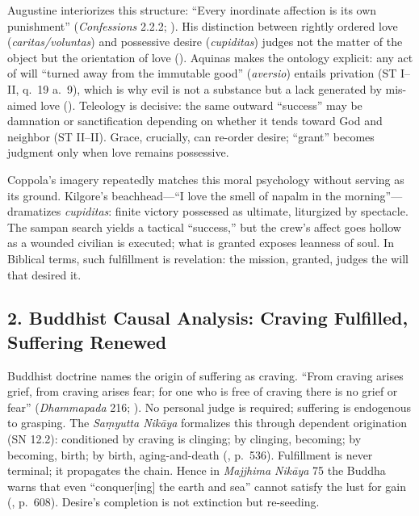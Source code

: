 Augustine interiorizes this structure: ``Every inordinate affection is its own punishment'' (\emph{Confessions} 2.2.2; ). His distinction between rightly ordered love (\emph{caritas/voluntas}) and possessive desire (\emph{cupiditas}) judges not the matter of the object but the orientation of love (\parencite{AugustineCity2003}). Aquinas makes the ontology explicit: any act of will ``turned away from the immutable good'' (\emph{aversio}) entails privation (ST I--II, q.~19 a.~9), which is why evil is not a substance but a lack generated by mis-aimed love (). Teleology is decisive: the same outward ``success'' may be damnation or sanctification depending on whether it tends toward God and neighbor (ST II--II). Grace, crucially, can re-order desire; ``grant'' becomes judgment only when love remains possessive.

Coppola’s imagery repeatedly matches this moral psychology without serving as its ground. Kilgore’s beachhead---``I love the smell of napalm in the morning''---dramatizes \emph{cupiditas}: finite victory possessed as ultimate, liturgized by spectacle. The sampan search yields a tactical ``success,'' but the crew’s affect goes hollow as a wounded civilian is executed; what is granted exposes leanness of soul. In Biblical terms, such fulfillment is revelation: the mission, granted, judges the will that desired it.

\subsection*{2. Buddhist Causal Analysis: Craving Fulfilled, Suffering Renewed}
\label{ssec:2-buddhist-causal-analysis-craving-fulfilled-suffering-renewed}

Buddhist doctrine names the origin of suffering as craving. ``From craving arises grief, from craving arises fear; for one who is free of craving there is no grief or fear'' (\emph{Dhammapada} 216; \parencite{BuddharakkhitaDhp1993}). No personal judge is required; suffering is endogenous to grasping. The \emph{Saṃyutta Nikāya} formalizes this through dependent origination (SN 12.2): conditioned by craving is clinging; by clinging, becoming; by becoming, birth; by birth, aging-and-death (\parencite{BodhiSN2000}, p.~536). Fulfillment is never terminal; it propagates the chain. Hence in \emph{Majjhima Nikāya} 75 the Buddha warns that even ``conquer[ing] the earth and sea'' cannot satisfy the lust for gain (\parencite{NanamoliBodhiMN1995}, p.~608). Desire’s completion is not extinction but re-seeding.

